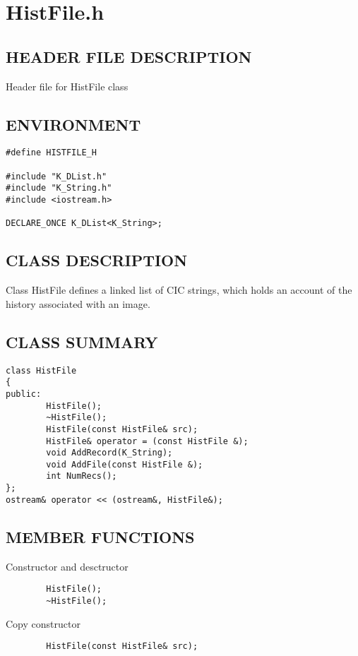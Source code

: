 \clearpage
\section{HistFile.h}

\subsection*{HEADER FILE DESCRIPTION}
Header file for HistFile class
  
\subsection*{ENVIRONMENT}
\begin{verbatim}
#define HISTFILE_H

#include "K_DList.h"
#include "K_String.h"
#include <iostream.h>

DECLARE_ONCE K_DList<K_String>;
\end{verbatim}

\subsection*{CLASS DESCRIPTION}
    Class HistFile defines a linked list of CIC strings, which holds
   an account of the history associated with an image.

\subsection*{CLASS SUMMARY}
\begin{verbatim}
class HistFile
{
public:
        HistFile();
        ~HistFile();
        HistFile(const HistFile& src);
        HistFile& operator = (const HistFile &);
        void AddRecord(K_String);
        void AddFile(const HistFile &);
        int NumRecs();
};
ostream& operator << (ostream&, HistFile&);
\end{verbatim}

\subsection*{MEMBER FUNCTIONS}
           Constructor and desctructor
\begin{verbatim}
        HistFile();
        ~HistFile();
\end{verbatim}

           Copy constructor
\begin{verbatim}
        HistFile(const HistFile& src);
\end{verbatim}

